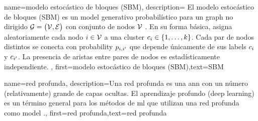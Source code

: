 {
	name=modelo estocástico de bloques (SBM),
	description={
		El modelo estocástico de bloques (SBM) es un \gls{model} generativo probabilístico para un \gls{graph} no dirigido $\mathcal{G} = \big( \mathcal{V}, \mathcal{E} \big)$ con conjunto de nodos $\mathcal{V}$ \cite{AbbeSBM2018}.
		En su forma básica, asigna aleatoriamente cada nodo $i \in \mathcal{V}$ a una \gls{cluster} $c_{i} \in \{1,\ldots,k\}$.
		Cada par de nodos distintos se conecta con \gls{probability} $p_{i,i'}$ que depende únicamente de sus \gls{label}s $c_{i}$ y $c_{i'}$.
		La presencia de aristas entre pares de nodos es estadísticamente independiente.
	},
	first={modelo estocástico de bloques (SBM)},text={SBM}
}


{name={red profunda},
	description={Una red profunda es una \gls{ann} con un número (relativamente) grande 
	de capas ocultas. El aprendizaje profundo (deep learning) es un término general para los métodos de \gls{ml} 
	que utilizan una red profunda como \gls{model}  \cite{Goodfellow-et-al-2016}.},
	first={red profunda},text={red profunda} 
}

\newcommand{\gaussiancenter}{3}

